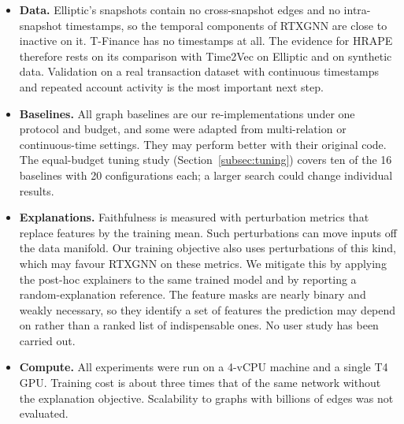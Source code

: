 \begin{itemize}
\item \textbf{Data.} Elliptic's snapshots contain no cross-snapshot edges and no intra-snapshot timestamps, so the temporal components of RTXGNN are close to inactive on it. T-Finance has no timestamps at all. The evidence for HRAPE therefore rests on its comparison with Time2Vec on Elliptic and on synthetic data. Validation on a real transaction dataset with continuous timestamps and repeated account activity is the most important next step.
\item \textbf{Baselines.} All graph baselines are our re-implementations under one protocol and budget, and some were adapted from multi-relation or continuous-time settings. They may perform better with their original code. The equal-budget tuning study (Section~\ref{subsec:tuning}) covers ten of the 16 baselines with 20 configurations each; a larger search could change individual results.
\item \textbf{Explanations.} Faithfulness is measured with perturbation metrics that replace features by the training mean. Such perturbations can move inputs off the data manifold. Our training objective also uses perturbations of this kind, which may favour RTXGNN on these metrics. We mitigate this by applying the post-hoc explainers to the same trained model and by reporting a random-explanation reference. The feature masks are nearly binary and weakly necessary, so they identify a set of features the prediction may depend on rather than a ranked list of indispensable ones. No user study has been carried out.
\item \textbf{Compute.} All experiments were run on a 4-vCPU machine and a single T4 GPU. Training cost is about three times that of the same network without the explanation objective. Scalability to graphs with billions of edges was not evaluated.
\end{itemize}
